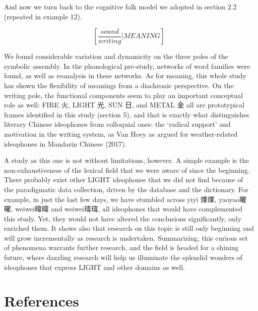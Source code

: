 And now we turn back to the cognitive folk model we adopted in section
2.2 (repeated in example 12).

\[[\frac{sound}{writing}|MEANING]\]

We found considerable variation and dynamicity on the three poles of the
symbolic assembly. In the phonological pre-study, networks of word
families were found, as well as reanalysis in these networks. As for
meaning, this whole study has shown the flexibility of meanings from a
diachronic perspective. On the writing pole, the functional components
seem to play an important conceptual role as well: FIRE 火, LIGHT 光,
SUN 日, and METAL 金 all are prototypical frames identified in this
study (section 5), and that is exactly what distinguishes literary
Chinese ideophones from colloquial ones: the `radical support' and
motivation in the writing system, as Van Hoey as argued for
weather-related ideophones in Mandarin Chinese (2017).

A study as this one is not without limitations, however. A simple
example is the non-exhaustiveness of the lexical field that we were
aware of since the beginning. There probably exist other LIGHT
ideophones that we did not find because of the paradigmatic data
collection, driven by the database and the dictionary. For example, in
just the last few days, we have stumbled across yiyi 燡燡, yaoyao曜曜,
weiwei暐暐 and weiwei瑋瑋, all ideophones that would have complemented
this study. Yet, they would not have altered the conclusions
significantly, only enriched them. It shows also that research on this
topic is still only beginning and will grow incrementally as research is
undertaken. Summarizing, this curious set of phenomena warrants further
research, and the field is headed for a shining future, where dazzling
research will help us illuminate the splendid wonders of ideophones that
express LIGHT and other domains as well.

\section{References}\label{references}


